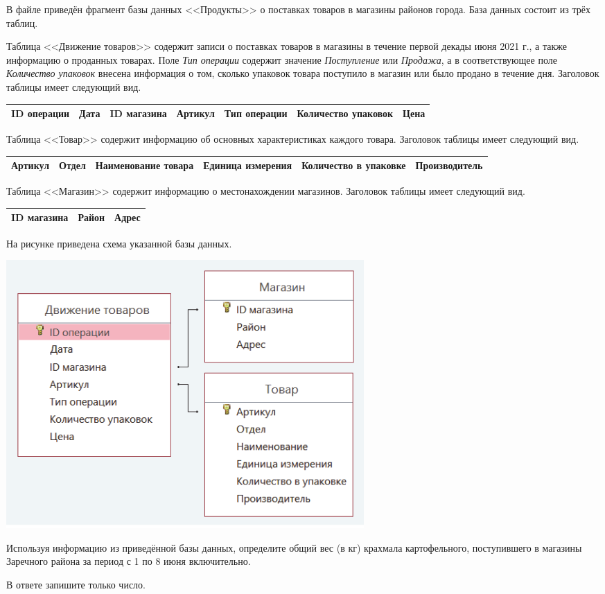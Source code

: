 \documentclass[14pt,a4paper]{article}
\begin{document}
В файле приведён фрагмент базы данных <<Продукты>> о поставках товаров
в магазины районов города. База данных состоит из трёх таблиц.

Таблица <<Движение товаров>> содержит записи о поставках товаров в
магазины в течение первой декады июня 2021 г., а также информацию о
проданных товарах. Поле \textit{Тип операции} содержит значение
\textit{Поступление} или \textit{Продажа}, а в соответствующее поле
\textit{Количество упаковок} внесена информация о том, сколько
упаковок товара поступило в магазин или было продано в течение дня.
Заголовок таблицы имеет следующий вид.

\begin{center}
	\begin{tabular}{|c|c|c|c|c|c|c|}
		\hline
		ID операции & Дата & ID магазина & Артикул & Тип операции & Количество упаковок & Цена \\
		\hline
	\end{tabular}
\end{center}

Таблица <<Товар>> содержит информацию об основных характеристиках
каждого товара. Заголовок таблицы имеет следующий вид.

\begin{center}
	\begin{tabular}{|c|c|c|c|c|c|}
		\hline
		Артикул & Отдел & Наименование товара & Единица измерения & Количество в упаковке & Производитель \\
		\hline
	\end{tabular}
\end{center}

Таблица <<Магазин>> содержит информацию о местонахождении магазинов.
Заголовок таблицы имеет следующий вид.

\begin{center}
	\begin{tabular}{|c|c|c|}
		\hline
		ID магазина & Район & Адрес \\
		\hline
	\end{tabular}
\end{center}

На рисунке приведена схема указанной базы данных.

\begin{center}
	\includegraphics[width=0.6\textwidth]{table.png}
\end{center}

Используя информацию из приведённой базы данных, определите общий вес
(в кг) крахмала картофельного, поступившего в магазины Заречного
района за период с 1 по 8 июня включительно.

В ответе запишите только число.
\end{document}
